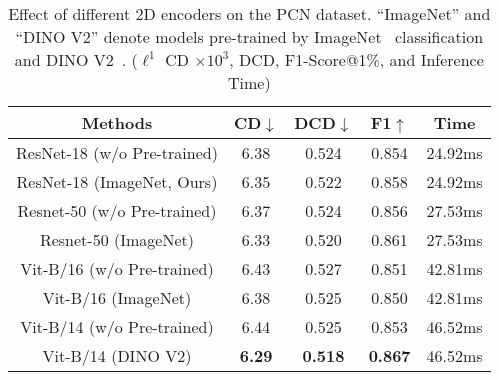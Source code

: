 \begin{table}
        \renewcommand\arraystretch{1.2}
        \centering
        \caption{Robustness to random perturbation of projection on the PCN dataset. ({$\displaystyle \ell ^{1}$} CD $\times 10^3$, DCD, and F1-Score@1\%)}
        \label{tab:ablationNoise}
        \footnotesize
\end{table}

\begin{table}[t]
        \renewcommand\arraystretch{1.2}
        \centering
        \caption{Effect of different 2D encoders on the PCN dataset. ``ImageNet'' and ``DINO V2'' denote models pre-trained by ImageNet~\citep{5206848} classification and DINO V2~\citep{dinov2}. ({$\displaystyle \ell ^{1}$} CD $\times 10^3$, DCD, F1-Score@1\%, and Inference Time)}
        \label{tab:ablation2Dbackbone}
        \small
        \begin{tabular}{|c|c c c|c|}
        \hline
        Methods  & CD$\downarrow$ & DCD$\downarrow$ & F1$\uparrow$ & Time \\
        \hline
        ResNet-18 (w/o Pre-trained) & 6.38 & 0.524 & 0.854 & 24.92ms \\
        ResNet-18 (ImageNet, Ours) & 6.35 & 0.522 & 0.858 & 24.92ms\\
        Resnet-50 (w/o Pre-trained) & 6.37 & 0.524 & 0.856 & 27.53ms\\
        Resnet-50 (ImageNet) & 6.33 & 0.520 & 0.861 & 27.53ms\\
        Vit-B/16 (w/o Pre-trained) & 6.43 & 0.527 & 0.851 & 42.81ms\\
        Vit-B/16 (ImageNet) & 6.38 & 0.525 & 0.850 & 42.81ms\\
        Vit-B/14 (w/o Pre-trained) & 6.44 & 0.525 & 0.853 & 46.52ms\\
        Vit-B/14 (DINO V2) & \textbf{6.29} & \textbf{0.518} & \textbf{0.867} & 46.52ms\\
        \hline
        \end{tabular}
\end{table}

